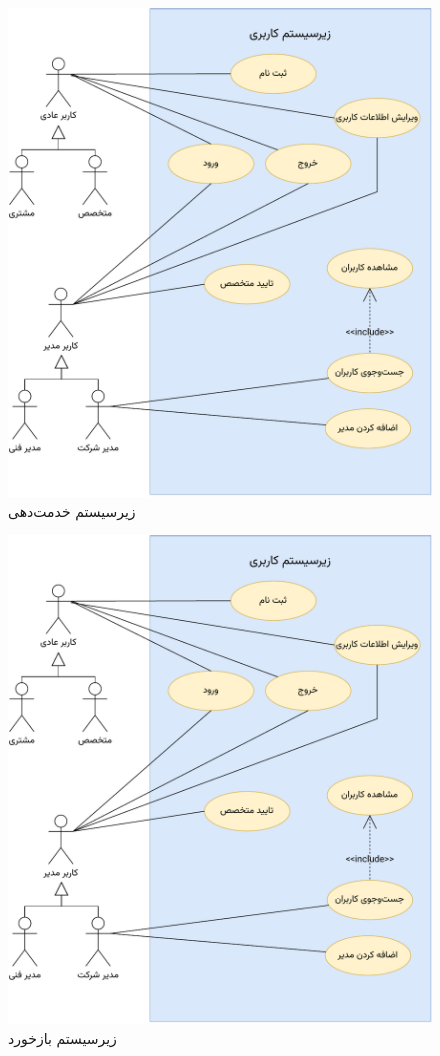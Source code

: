 \begin{figure}
\centering
	\includegraphics[scale=0.8, page=2]{figs/usecase.pdf}
\caption{زیرسیستم خدمت‌دهی}
\end{figure}
\FloatBarrier
\newpage

\begin{figure}
\centering
	\includegraphics[scale=0.9, page=3]{figs/usecase.pdf}
\caption{زیرسیستم بازخورد}
\end{figure}
\FloatBarrier
\newpage

